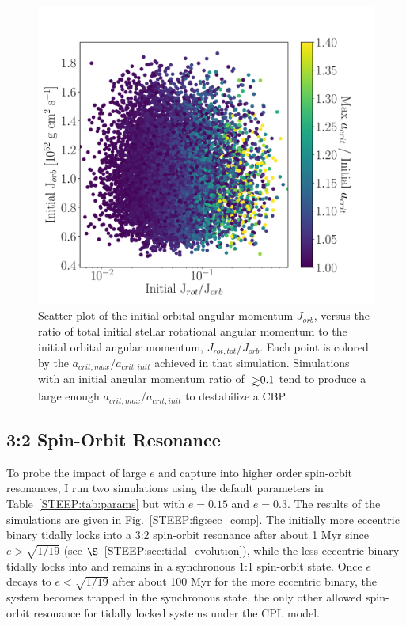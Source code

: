 \begin{figure}
	\includegraphics[width=\columnwidth]{mc_uniform.pdf}
    \caption{Scatter plot of the initial orbital angular momentum $J_{orb}$, versus the ratio of total initial stellar rotational angular momentum to the initial orbital angular momentum, $J_{rot,tot}$/$J_{orb}$.  Each point is colored by the $a_{crit,max}$/$a_{crit,init}$ achieved in that simulation.  Simulations with an initial angular momentum ratio of ${\gsim}0.1$ tend to produce a large enough $a_{crit,max}$/$a_{crit,init}$ to destabilize a CBP.}
    \label{STEEP:fig:mc_uniform}
\end{figure}

\subsection{3:2 Spin-Orbit Resonance} \label{STEEP:sec:32}

To probe the impact of large $e$ and capture into higher order spin-orbit resonances, I run two simulations using the default parameters in Table~\ref{STEEP:tab:params} but with $e = 0.15$ and $e = 0.3$.  The results of the simulations are given in Fig.~\ref{STEEP:fig:ecc_comp}.  The initially more eccentric binary tidally locks into a 3:2 spin-orbit resonance after about 1 Myr since $e > \sqrt{1/19}$ (see $\S$~\ref{STEEP:sec:tidal_evolution}), while the less eccentric binary tidally locks into and remains in a synchronous 1:1 spin-orbit state.  Once $e$ decays to $e < \sqrt{1/19}$ after about 100 Myr for the more eccentric binary, the system becomes trapped in the synchronous state, the only other allowed spin-orbit resonance for tidally locked systems under the CPL model.

